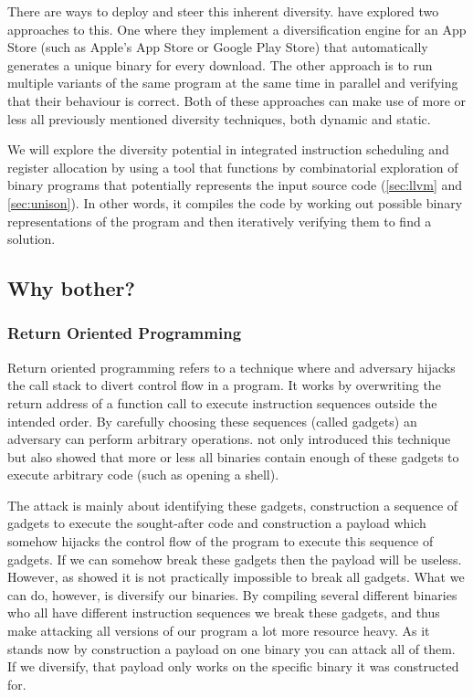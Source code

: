 There are ways to deploy and steer this inherent diversity. \textcite{compiler-generated-sw-div}
have explored two approaches to this. One where they implement a diversification engine for
an App Store (such as Apple's App Store or Google Play Store) that automatically generates
a unique binary for every download. The other approach is to run multiple variants of the
same program at the same time in parallel and verifying that their behaviour is correct.
Both of these approaches can make use of more or less all previously mentioned diversity
techniques, both dynamic and static.

We will explore the diversity potential in integrated instruction scheduling and register
allocation by using a tool that functions by combinatorial exploration of binary programs
that potentially represents the input source code (\ref{sec:llvm} and \ref{sec:unison}).
In other words, it compiles the code by working out possible binary representations of the
program and then iteratively verifying them to find a solution.

\subsection{Why bother?}
\subsubsection{Return Oriented Programming}
Return oriented programming refers to a technique where and adversary hijacks the call 
stack to divert control flow in a program. It works by overwriting the return address of 
a function call to execute instruction sequences outside the intended order. By carefully
choosing these sequences (called gadgets) an adversary can perform arbitrary operations. 
\textcite{rop} not only introduced this technique but also showed that more or less all 
binaries contain enough of these gadgets to execute arbitrary code (such as opening a shell).

The attack is mainly about identifying these gadgets, construction a sequence of
gadgets to execute the sought-after code and construction a payload which somehow hijacks
the control flow of the program to execute this sequence of gadgets. If we can somehow
break these gadgets then the payload will be useless. However, as \textcite{rop} showed
it is not practically impossible to break all gadgets. What we can do, however, is diversify
our binaries. By compiling several different binaries who all have different instruction
sequences we break these gadgets, and thus make attacking all versions of our program
a lot more resource heavy. As it stands now by construction a payload on one binary you can
attack all of them. If we diversify, that payload only works on the specific binary it was
constructed for.


